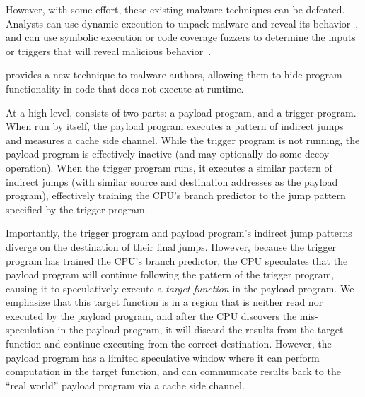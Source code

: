 However, with some effort, these existing malware techniques can be defeated.
Analysts can use
dynamic execution to unpack malware and reveal its
behavior~\cite{balzarotti2010efficient}, and can use symbolic execution or code
coverage fuzzers to determine the inputs or triggers that will reveal malicious
behavior~\cite{moser2007exploring,schwartz2010all,wang2017angr,egele2012survey}.


\speculake provides a new technique to malware authors, allowing them to hide
program functionality in code that does not execute at runtime.


At a high level, \speculake consists of two parts: a payload program, and a
trigger program. When run by itself, the payload program executes a pattern of
indirect jumps and measures a cache side channel. While the trigger program is
not running, the payload program is effectively inactive (and may optionally do some
decoy operation). When the trigger program runs, it executes a similar pattern of
indirect jumps (with similar source and destination addresses as the payload
program), effectively training the CPU's branch predictor to the jump pattern
specified by the trigger program.

Importantly, the trigger program and payload
program's indirect jump patterns diverge on the destination of their final jumps.
However, because the trigger program has trained the CPU's branch predictor, the
CPU speculates that the payload program will continue following the pattern of
the trigger program, causing it to speculatively execute a
\emph{target function} in the payload program. We emphasize that this target
function is in a region that is neither read nor executed by the payload
program, and after the CPU discovers the mis-speculation in the payload program,
it will discard the results from the target function and continue executing from
the correct destination. However, the payload program has a limited speculative
window where it can perform computation in the target function, and can
communicate results back to the ``real world'' payload program via a cache side
channel.



\FigHighLevel



